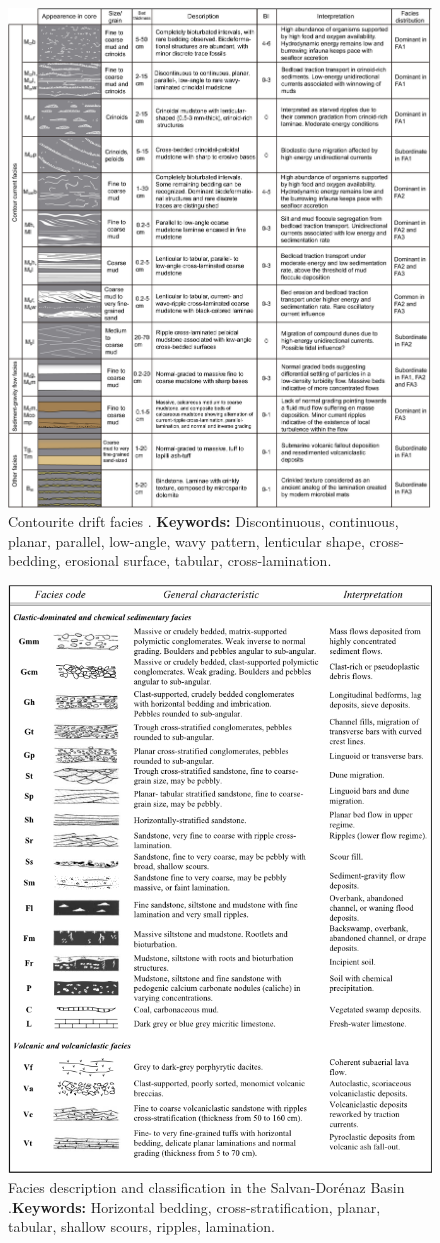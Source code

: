 \begin{figure}[h!]
    \centering
    \includegraphics[width=0.75\linewidth]{Figures/0.4Field/Paz2022.jpg}
    \caption[Contourite drift facies]{Contourite drift facies \citep{Paz2022}. \textbf{Keywords:} Discontinuous, continuous, planar, parallel, low-angle, wavy pattern, lenticular shape, cross-bedding, erosional surface, tabular, cross-lamination.}
    \label{fig:Paz2022-1}
\end{figure}

\begin{figure}[h!]
    \centering
    \includegraphics[width=0.75\linewidth]{Figures/0.4Field/Capuzzo2004-1.png}
    \caption[Facies description and classification in the Salvan-Dorénaz Basin]{Facies description and classification in the Salvan-Dorénaz Basin \citep{Capuzzo2004}.\textbf{Keywords:} Horizontal bedding, cross-stratification, planar, tabular, shallow scours, ripples, lamination.}
    \label{fig:Capuzzo2004-1}
\end{figure}
\clearpage